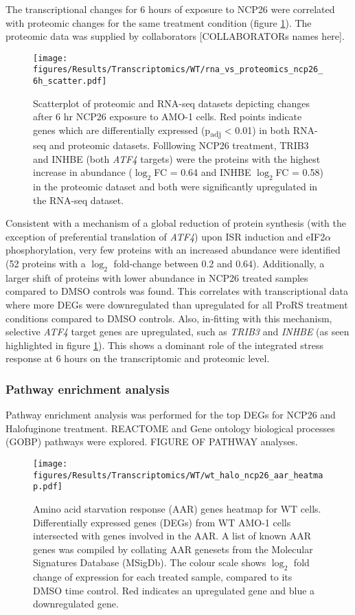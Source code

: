 The transcriptional changes for 6 hours of exposure to NCP26 were correlated with proteomic changes for the same treatment condition (figure \ref{fig:proteomic_rna_scatter}).
The proteomic data was supplied by collaborators [COLLABORATORs names here].
\begin{figure}[htb]
\centering
\texttt{[image: figures/Results/Transcriptomics/WT/rna\_vs\_proteomics\_ncp26\_6h\_scatter.pdf]}
\caption[]{Scatterplot of proteomic and RNA-seq datasets depicting changes after 6 hr NCP26 exposure to AMO-1 cells.
Red points indicate genes which are differentially expressed (p\textsubscript{adj} < 0.01) in both RNA-seq and proteomic datasets.
Folllowing NCP26 treatment, TRIB3 and INHBE (both \textit{ATF4} targets) were the proteins with the highest increase in abundance ($\log_{2}$FC = 0.64 and INHBE  $\log_{2}$FC = 0.58) in the proteomic dataset and both were significantly upregulated in the RNA-seq dataset.
}
\label{fig:proteomic_rna_scatter}
\end{figure}
%
Consistent with a mechanism of a global reduction of protein synthesis (with the exception of preferential translation of \textit{ATF4}) upon  ISR induction and eIF2$\alpha$ phosphorylation, very few proteins with an increased abundance were identified (52 proteins with a $\log_{2}$ fold-change between 0.2 and 0.64).
Additionally, a larger shift of proteins with lower abundance in NCP26 treated samples compared to DMSO controls was found.
This correlates with transcriptional data where more DEGs were downregulated than upregulated for all ProRS treatment conditions compared to DMSO controls.
Also, in-fitting with this mechanism, selective \textit{ATF4} target genes are upregulated, such as \textit{TRIB3} and \textit{INHBE} (as seen highlighted in figure \ref{fig:proteomic_rna_scatter}).
This shows a dominant role of the integrated stress response at 6 hours on the transcriptomic and proteomic level.


\subsubsection{Pathway enrichment analysis}
Pathway enrichment analysis was performed for the top DEGs for NCP26 and Halofuginone treatment.
REACTOME and Gene ontology biological processes (GOBP) pathways were explored.
FIGURE OF PATHWAY analyses.


\begin{figure}[p]
\centering
\texttt{[image: figures/Results/Transcriptomics/WT/wt\_halo\_ncp26\_aar\_heatmap.pdf]}
\caption[Amino acid starvation response genes heatmap WT cells]{Amino acid starvation response (AAR) genes heatmap for WT cells.
Differentially expressed genes (DEGs) from WT AMO-1 cells intersected with genes involved in the AAR.
A list of known AAR genes was compiled by collating AAR genesets from the Molecular Signatures Database (MSigDb).
The colour scale shows $\log_{2}$ fold change of expression for each treated sample, compared to its DMSO time control.
Red indicates an upregulated gene and blue a downregulated gene.
}
\label{fig:wt_aar_heatmap}
\end{figure}

